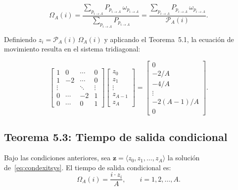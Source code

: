 \documentclass[12pt]{article}
\begin{document}
\begin{equation}
  \Omega_A(i) = \frac{\displaystyle\sum_{p_{i\to A}} P_{p_{i\to A}}\,\omega_{p_{i\to A}}}
                     {\displaystyle\sum_{p_{i\to A}} P_{p_{i\to A}}}
             = \frac{\displaystyle\sum_{p_{i\to A}} P_{p_{i\to A}}\,\omega_{p_{i\to A}}}
                    {\mathcal{P}_A(i)}.
  \label{eq:condexitdef}
\end{equation}

Definiendo $z_i = \mathcal{P}_A(i)\,\Omega_A(i)$ y aplicando el Teorema~5.1,
la ecuaci\'on de movimiento resulta en el sistema tridiagonal:

\begin{equation}
  \begin{bmatrix}
    1 & 0 & \cdots & 0 \\
    1 & -2 & \cdots & 0 \\
    \vdots & & \ddots & \vdots \\
    0 & \cdots & -2 & 1 \\
    0 & \cdots & 0 & 1
  \end{bmatrix}
  \begin{bmatrix} z_0 \\ z_1 \\ \vdots \\ z_{A-1} \\ z_A \end{bmatrix}
  =
  \begin{bmatrix} 0 \\ -2/A \\ -4/A \\ \vdots \\ -2(A-1)/A \\ 0 \end{bmatrix}.
  \label{eq:condexitsys}
\end{equation}

\subsection{Teorema 5.3: Tiempo de salida condicional}

\begin{tcolorbox}[colback=gray!5, colframe=gray!50, title=\textbf{Teorema~5.3}]
Bajo las condiciones anteriores, sea $\mathbf{z} = \langle z_0, z_1, \ldots, z_A\rangle$
la soluci\'on de~\eqref{eq:condexitsys}. El tiempo de salida condicional es:
\begin{equation}
  \Omega_A(i) = \frac{i \cdot z_i}{A}, \qquad i = 1, 2, \ldots, A.
  \label{eq:condexit}
\end{equation}
\end{tcolorbox}
\end{document}

